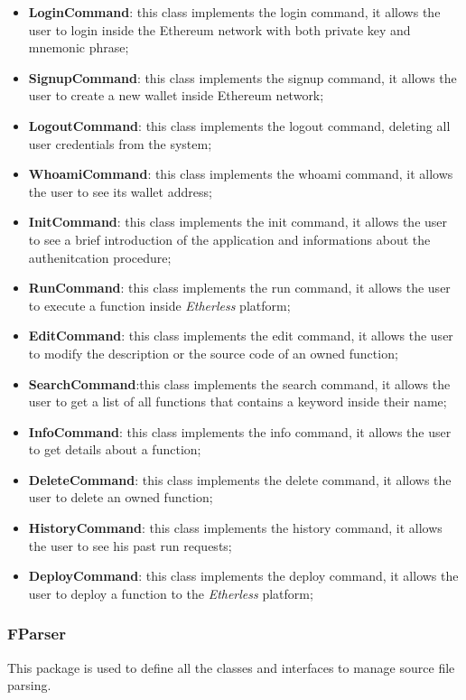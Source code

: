 			\begin{itemize}
				\item \textbf{LoginCommand}: this class implements the login command, it allows the user to login inside the Ethereum network with both private key and mnemonic phrase; 
				\item \textbf{SignupCommand}: this class implements the signup command, it allows the user to create a new wallet inside Ethereum network; 
				\item \textbf{LogoutCommand}: this class implements the logout command, deleting all user credentials from the system;  
				\item \textbf{WhoamiCommand}: this class implements the whoami command, it allows the user to see its wallet address; 
				\item \textbf{InitCommand}: this class implements the init command, it allows the user to see a brief introduction of the application and informations about the authenitcation procedure; 
				\item \textbf{RunCommand}: this class implements the run command, it allows the user to execute a function inside \textit{Etherless} platform; 
				\item \textbf{EditCommand}: this class implements the edit command, it allows the user to modify the description or the source code of an owned function; 
				\item \textbf{SearchCommand}:this class implements the search command, it allows the user to get a list of all functions that contains a keyword inside their name; 
				\item \textbf{InfoCommand}: this class implements the info command, it allows the user to get details about a function; 
				\item \textbf{DeleteCommand}: this class implements the delete command, it allows the user to delete an owned function; 
				\item \textbf{HistoryCommand}: this class implements the history command, it allows the user to see his past run requests;
				\item \textbf{DeployCommand}: this class implements the deploy command, it allows the user to deploy a function to the \textit{Etherless} platform;
			\end{itemize}
		
		\subsubsection{FParser}
 		This package is used to define all the classes and interfaces to manage source file parsing.
		
